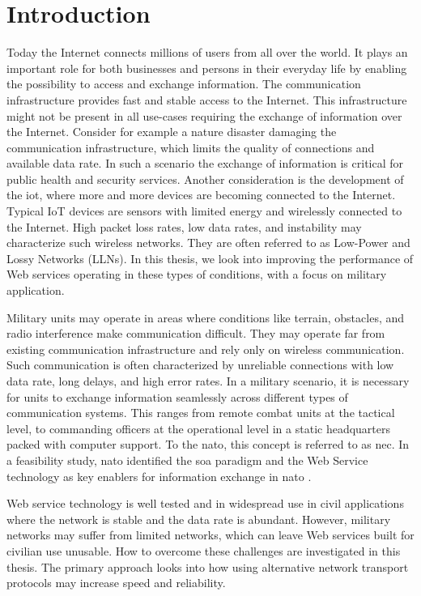 
\chapter{Introduction}

Today the Internet connects millions of users from all over the world. It plays
an important role for both businesses and persons in their everyday life by
enabling the possibility to access and exchange information. The communication
infrastructure provides fast and stable access to the Internet. This
infrastructure might not be present in all use-cases requiring the exchange of
information over the Internet. Consider for example a nature disaster damaging
the communication infrastructure, which limits the quality of connections and
available data rate. In such a scenario the exchange of information is critical
for public health and security services. Another consideration is the
development of the \gls{iot}, where more and more devices are becoming connected
to the Internet. Typical IoT devices are sensors with limited energy and
wirelessly connected to the Internet. High packet loss rates, low data rates,
and instability may characterize such wireless networks. They are often referred
to as Low-Power and Lossy Networks (LLNs). In this thesis, we look into improving
the performance of Web services operating in these types of conditions, with a
focus on military application.


Military units may operate in areas where conditions like terrain, obstacles,
and radio interference make communication difficult. They may operate far from
existing communication infrastructure and rely only on wireless communication.
Such communication is often characterized by unreliable connections with low
data rate, long delays, and high error rates. In a military scenario, it is
necessary for units to exchange information seamlessly across different types of
communication systems. This ranges from remote combat units at the tactical
level, to commanding officers at the operational level in a static headquarters
packed with computer support. To the \gls{nato}, this concept is referred to as
\gls{nec}. In a feasibility study, \gls{nato} identified the \gls{soa} paradigm
and the Web Service technology as key enablers for information exchange in
\gls{nato} \cite{nnec-study}.

Web service technology is well tested and in widespread use in civil
applications where the network is stable and the data rate is abundant. However,
military networks may suffer from limited networks, which can leave Web services
built for civilian use unusable. How to overcome these challenges are
investigated in this thesis. The primary approach looks into how using
alternative network transport protocols may increase speed and reliability.

